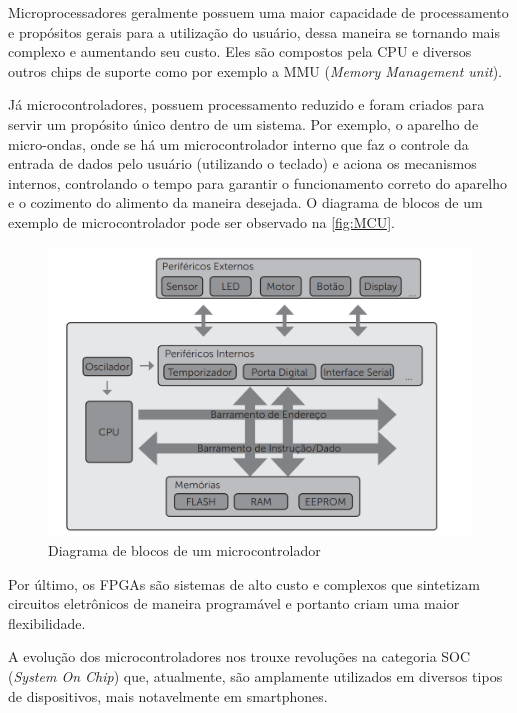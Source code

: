 \documentclass[
	12pt,				%
	openright,			%
	twoside,			%
	a4paper,			%
	english,			%
	french,				%
	spanish,			%
	brazil				%
	]{abntex2}
\begin{document}
Microprocessadores geralmente possuem uma maior capacidade de processamento e propósitos gerais para a utilização do usuário, dessa maneira se tornando mais complexo e aumentando seu custo. Eles são compostos pela CPU e diversos outros chips de suporte como por exemplo a MMU (\emph{Memory Management unit}). 

Já microcontroladores, possuem processamento reduzido e foram criados para servir um propósito único dentro de um sistema. Por exemplo, o aparelho de micro-ondas, onde se há um microcontrolador interno que faz o controle da entrada de dados pelo usuário (utilizando o teclado) e aciona os mecanismos internos, controlando o tempo para garantir o funcionamento correto do aparelho e o cozimento do alimento da maneira desejada. O diagrama de blocos de um exemplo de microcontrolador pode ser observado na \autoref{fig:MCU}.

\begin{figure}[H]
	\caption{\label{fig:MCU}Diagrama de blocos de um microcontrolador}
	\begin{center}
	    \includegraphics[scale=0.4]{img/MCU.png}
	\end{center}
\end{figure}

Por último, os FPGAs são sistemas de alto custo e complexos que sintetizam circuitos eletrônicos de maneira programável e portanto criam uma maior flexibilidade. 

A evolução dos microcontroladores nos trouxe revoluções na categoria SOC (\emph{System On Chip}) que, atualmente, são amplamente utilizados em diversos tipos de dispositivos, mais notavelmente em smartphones.
\end{document}
